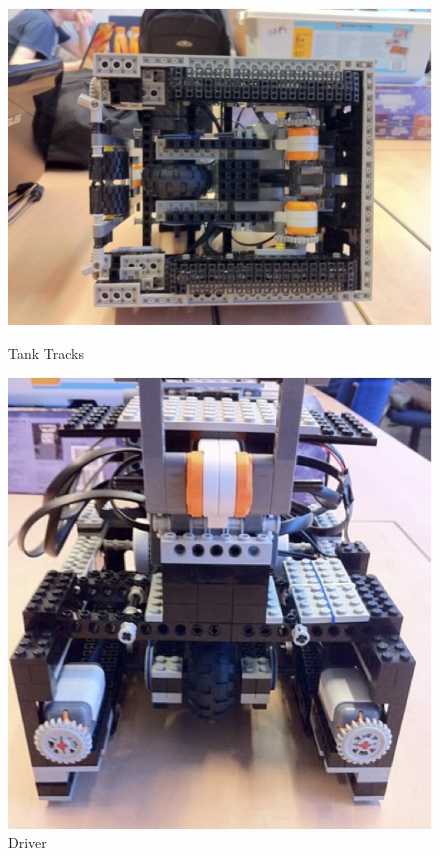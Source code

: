 \documentclass[12pt, a4paper, titlepage]{article}
\begin{document}
\begin{figure}[ht]
\begin{minipage}[b]{0.5\linewidth}
\centering
\includegraphics[scale=0.8]{images/robot/bottomview.jpg}
\caption{Tank Tracks}
\label{fig:tanktracks}
\end{minipage}
\hspace{0.5cm}
\begin{minipage}[b]{0.5\linewidth}
\centering
\includegraphics[scale=0.8]{images/robot/driver.jpg}
\caption{Driver}
\label{fig:driver}
\end{minipage}
\end{figure}
\end{document}
